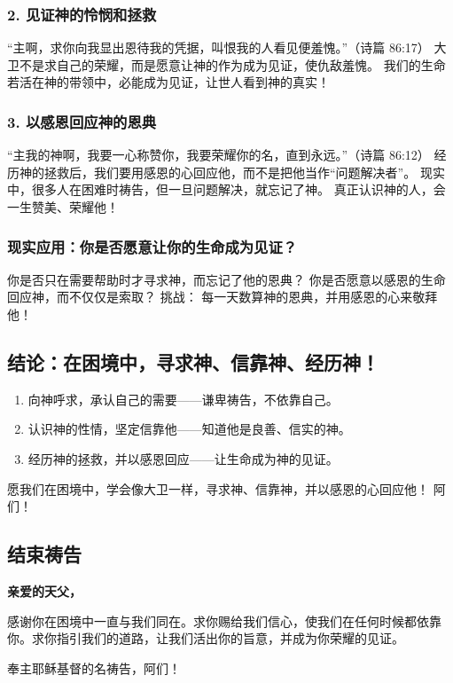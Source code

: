\documentclass[a4paper, 12pt]{article}
\begin{document}
\subsubsection*{2. 见证神的怜悯和拯救}
“主啊，求你向我显出恩待我的凭据，叫恨我的人看见便羞愧。”（诗篇 86:17）
大卫不是求自己的荣耀，而是愿意让神的作为成为见证，使仇敌羞愧。
我们的生命若活在神的带领中，必能成为见证，让世人看到神的真实！
\subsubsection*{3. 以感恩回应神的恩典}
“主我的神啊，我要一心称赞你，我要荣耀你的名，直到永远。”（诗篇 86:12）
经历神的拯救后，我们要用感恩的心回应他，而不是把他当作“问题解决者”。
现实中，很多人在困难时祷告，但一旦问题解决，就忘记了神。
真正认识神的人，会一生赞美、荣耀他！
\subsubsection*{现实应用：你是否愿意让你的生命成为见证？}
你是否只在需要帮助时才寻求神，而忘记了他的恩典？
你是否愿意以感恩的生命回应神，而不仅仅是索取？
挑战： 每一天数算神的恩典，并用感恩的心来敬拜他！
\subsection*{结论：在困境中，寻求神、信靠神、经历神！}
\begin{enumerate}
    \item 向神呼求，承认自己的需要——谦卑祷告，不依靠自己。

    \item 认识神的性情，坚定信靠他——知道他是良善、信实的神。

    \item 经历神的拯救，并以感恩回应——让生命成为神的见证。

\end{enumerate}

愿我们在困境中，学会像大卫一样，寻求神、信靠神，并以感恩的心回应他！ 阿们！
\subsection*{结束祷告}
\textbf{亲爱的天父，}

感谢你在困境中一直与我们同在。求你赐给我们信心，使我们在任何时候都依靠你。求你指引我们的道路，让我们活出你的旨意，并成为你荣耀的见证。

奉主耶稣基督的名祷告，阿们！
\newpage
\end{document}
